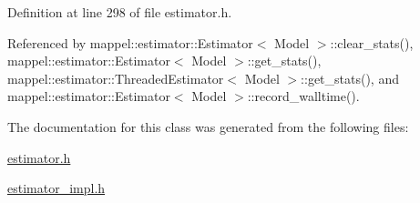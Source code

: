 Definition at line 298 of file estimator.\+h.



Referenced by mappel\+::estimator\+::\+Estimator$<$ Model $>$\+::clear\+\_\+stats(), mappel\+::estimator\+::\+Estimator$<$ Model $>$\+::get\+\_\+stats(), mappel\+::estimator\+::\+Threaded\+Estimator$<$ Model $>$\+::get\+\_\+stats(), and mappel\+::estimator\+::\+Estimator$<$ Model $>$\+::record\+\_\+walltime().



The documentation for this class was generated from the following files\+:\begin{DoxyCompactItemize}
\item 
\hyperlink{estimator_8h}{estimator.\+h}\item 
\hyperlink{estimator__impl_8h}{estimator\+\_\+impl.\+h}\end{DoxyCompactItemize}
